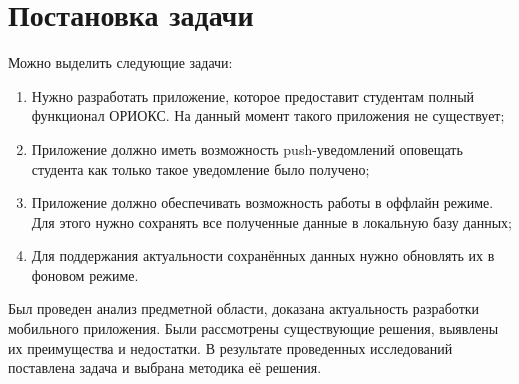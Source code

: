 \section{Постановка задачи}
\label{sec:problem}
Можно выделить следующие задачи:
\begin{enumerate}
  \item Нужно разработать приложение, которое предоставит студентам полный функционал ОРИОКС.
  На данный момент такого приложения не существует;
  \item Приложение должно иметь возможность push-уведомлений оповещать студента как только такое уведомление было получено;
  \item Приложение должно обеспечивать возможность работы в оффлайн режиме.
  Для этого нужно сохранять все полученные данные в локальную базу данных;
  \item Для поддержания актуальности сохранённых данных нужно обновлять их в фоновом режиме.
\end{enumerate}


\conclusions
\label{sec:researchConclusions}

Был проведен анализ предметной области, доказана актуальность разработки мобильного приложения.
Были рассмотрены существующие решения, выявлены их преимущества и недостатки.
В результате проведенных исследований поставлена задача и выбрана методика её решения.
